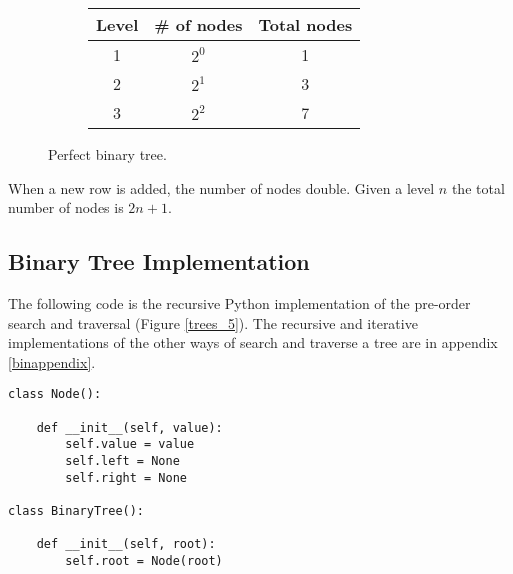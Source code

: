 \begin{figure}[H]
\centering
\begin{subfigure}[b]{0.4\linewidth}
\centering
{}
\end{subfigure}
\hspace{1em}
\begin{subfigure}[b]{0.4\linewidth}
\centering
\begin{tabular}[b]{c c c}
 Level & \# of nodes & Total nodes  \\
\hline
1 & $2^{0}$ & 1 \\
2 & $2^{1}$ & 3 \\
3 & $2^{2}$ & 7
\end{tabular}
\end{subfigure}
\caption[Perfect binary tree.]{Perfect binary tree.}
\label{trees_11}
\end{figure}

When a new row is added, the number of nodes double. Given a level \(n\) the total number of nodes is \(2n + 1\).

\subsection{Binary Tree Implementation}
The following code is the recursive Python implementation of the pre-order search and traversal (Figure \ref{trees_5}). The recursive and iterative implementations of the other ways of search and traverse a tree are in appendix \ref{binappendix}.

\begin{lstlisting}[firstnumber=1, caption={Class definition for a node and a tree.}]
class Node():

	def __init__(self, value):
		self.value = value
		self.left = None
		self.right = None

class BinaryTree():

	def __init__(self, root):
		self.root = Node(root)
\end{lstlisting}

